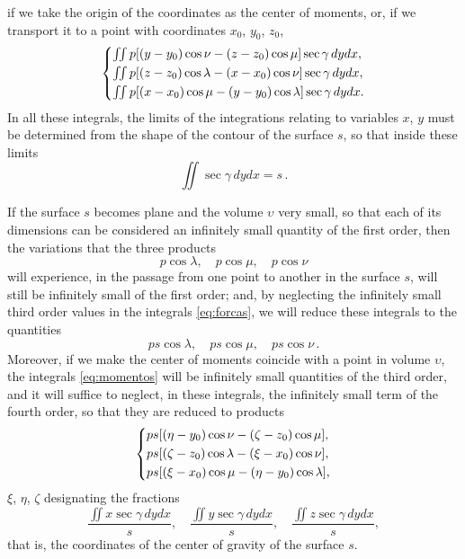 \documentclass[leqno,openright,smallroyalvopaper,8pt,twoside,showtrims]{memoir}
\begin{document}
if we take the origin of the coordinates as the center of moments, or, if we transport it to a point with coordinates $x_0$, $y_0$, $z_0$, 
 \begin{equation}\label{eq:momentos}
   \begin{dcases}
     \textstyle\iint   p[(y-y_0)\cos\nu-(z-z_0)\cos\mu]\sec\gamma\, dydx,\\
     \textstyle\iint   p[(z-z_0)\cos\lambda-(x-x_0)\cos\nu]\sec\gamma\, dydx,\\
     \textstyle\iint   p[(x-x_0)\cos\mu-(y-y_0)\cos\lambda]\sec\gamma\, dydx.
   \end{dcases}
 \end{equation}
 In all these integrals, the limits of the integrations relating to variables $x$, $y$ must be determined from the shape of the contour of the surface $s$, so that inside these limits 
\begin{equation}
\textstyle\iint\sec\gamma\, dydx = s\,.
\end{equation}

If the surface $s$ becomes plane and the volume $\upsilon$ very small, so that each of its dimensions can be considered an infinitely small quantity of the first order, then the variations that the three products
\begin{equation}
p\cos\lambda,\quad p\cos\mu,\quad p\cos\nu
\end{equation}
will experience, in the passage from one point to another in the surface $s$, will still be infinitely small of the first order; and, by neglecting the infinitely small third order values in the integrals \eqref{eq:forcas}, we will reduce these integrals to the quantities
\begin{equation}\label{eq:ps}
ps\cos\lambda,\quad ps\cos\mu,\quad ps\cos\nu\,.
\end{equation}
Moreover, if we make the center of moments coincide with a point in volume $\upsilon$, the integrals \eqref{eq:momentos} will be infinitely small quantities of the third order, and it will suffice to neglect, in these integrals, the infinitely small term of the fourth order, so that they are reduced to products
 \begin{equation}\label{eq:ps2}
   \begin{dcases}
        ps[(\eta-y_0)\cos\nu-(\zeta-z_0)\cos\mu],\\
       ps[(\zeta-z_0)\cos\lambda-(\xi-x_0)\cos\nu],\\
        ps[(\xi-x_0)\cos\mu-(\eta-y_0)\cos\lambda],
   \end{dcases}
 \end{equation}
 $\xi$, $\eta$, $\zeta$ designating the fractions
 \begin{equation}
 \dfrac{\textstyle\iint x\sec\gamma\, dydx}{s},\quad  \dfrac{\textstyle\iint y\sec\gamma\, dydx}{s},\quad  \dfrac{\textstyle\iint z\sec\gamma\, dydx}{s},
 \end{equation}
that is, the coordinates of the center of gravity of the surface $s$.
\end{document}
